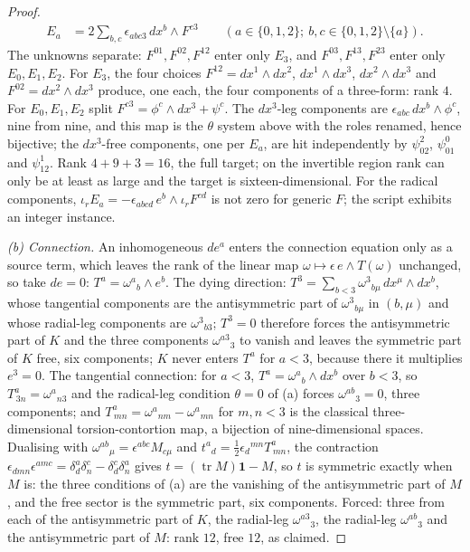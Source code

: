 \documentclass[11pt]{article}
\theoremstyle{definition}
\begin{document}
\begin{proof}
\[\begin{aligned}
E_a &= 2\sum_{b,c}\epsilon_{abc3}\,dx^b\wedge F^{c3} \qquad (a \in \{0,1,2\};\ b, c \in \{0,1,2\}\setminus\{a\}).
\end{aligned}
\]
The unknowns separate: $F^{01}, F^{02}, F^{12}$ enter only $E_3$, and $F^{03}, F^{13}, F^{23}$ enter only $E_0, E_1, E_2$. For $E_3$, the four choices $F^{12} = dx^1\wedge dx^2$, $dx^1\wedge dx^3$, $dx^2\wedge dx^3$ and $F^{02} = dx^2\wedge dx^3$ produce, one each, the four components of a three-form: rank $4$. For $E_0, E_1, E_2$ split $F^{c3} = \phi^c\wedge dx^3 + \psi^c$. The $dx^3$-leg components are $\epsilon_{abc}\,dx^b\wedge\phi^c$, nine from nine, and this map is the $\theta$ system above with the roles renamed, hence bijective; the $dx^3$-free components, one per $E_a$, are hit independently by $\psi^2_{02}$, $\psi^0_{01}$ and $\psi^1_{12}$. Rank $4 + 9 + 3 = 16$, the full target; on the invertible region rank can only be at least as large and the target is sixteen-dimensional. For the radical components, $\iota_r E_a = -\epsilon_{abcd}\,e^b\wedge\iota_r F^{cd}$ is not zero for generic $F$; the script exhibits an integer instance.

\emph{(b) Connection.} An inhomogeneous $de^a$ enters the connection equation only as a source term, which leaves the rank of the linear map $\omega \mapsto \epsilon\,e\wedge T(\omega)$ unchanged, so take $de = 0$: $T^a = \omega^{a}{}_{b}\wedge e^b$. The dying direction: $T^3 = \sum_{b<3}\omega^{3}{}_{b\mu}\,dx^\mu\wedge dx^b$, whose tangential components are the antisymmetric part of $\omega^{3}{}_{b\mu}$ in $(b,\mu)$ and whose radial-leg components are $\omega^{3}{}_{b3}$; $T^3 = 0$ therefore forces the antisymmetric part of $K$ and the three components $\omega^{a3}{}_{3}$ to vanish and leaves the symmetric part of $K$ free, six components; $K$ never enters $T^a$ for $a < 3$, because there it multiplies $e^3 = 0$. The tangential connection: for $a < 3$, $T^a = \omega^{a}{}_{b}\wedge dx^b$ over $b < 3$, so $T^a_{\,3n} = \omega^{a}{}_{n3}$ and the radical-leg condition $\theta = 0$ of (a) forces $\omega^{ab}{}_{3} = 0$, three components; and $T^a_{\,mn} = \omega^{a}{}_{nm} - \omega^{a}{}_{mn}$ for $m,n < 3$ is the classical three-dimensional torsion-contortion map, a bijection of nine-dimensional spaces. Dualising with $\omega^{ab}{}_{\mu} = \epsilon^{abc}M_{c\mu}$ and $t^{a}{}_{d} = \tfrac12\epsilon_{d}{}^{mn}T^a_{\,mn}$, the contraction $\epsilon_{dmn}\epsilon^{amc} = \delta^a_d\delta^c_n - \delta^c_d\delta^a_n$ gives $t = (\operatorname{tr}M)\mathbf{1} - M$, so $t$ is symmetric exactly when $M$ is: the three conditions of (a) are the vanishing of the antisymmetric part of $M$, and the free sector is the symmetric part, six components. Forced: three from each of the antisymmetric part of $K$, the radial-leg $\omega^{a3}{}_{3}$, the radial-leg $\omega^{ab}{}_{3}$ and the antisymmetric part of $M$: rank $12$, free $12$, as claimed.


\end{proof}
\end{document}

